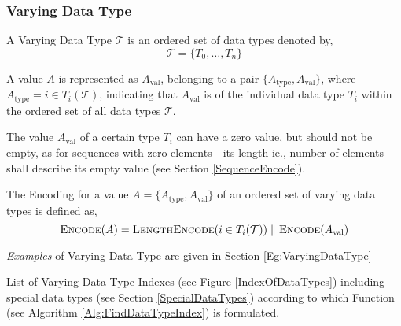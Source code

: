 \documentclass[../alan-handbook.tex]{subfiles}
\begin{document}
\subsubsection{Varying Data Type} 
\label{VaryingDataType}

A Varying Data Type $\mathcal{T}$ is an ordered set of data types denoted by,
$$\mathcal{T} = \{T_0, \ldots, T_n\}$$

A value $A$ is represented as $A_{\text{val}}$, belonging to a pair $\{A_{\text{type}}, A_{\text{val}}\}$, where $A_{\text{type}} = i \in T_i(\mathcal{T})$, indicating that $A_{\text{val}}$ is of the individual data type $T_i$ within the ordered set of all data types $\mathcal{T}$. 

The value $A_{\text{val}}$ of a certain type $T_i$ can have a zero value, but should not be empty, as for sequences with zero elements - its length ie., number of elements shall describe its empty value (see Section \ref{SequenceEncode}).

The Encoding for a value $A=\{A_{\text{type}}, A_{\text{val}}\}$ of an ordered set of varying data types is defined as,
$$\Call{Encode}{A} = \Call{LengthEncode}{i \in T_i(\mathcal{T})} \parallel \Call{Encode}{A_{\text{val}}}$$

\textit{Examples} of Varying Data Type are given in Section \ref{Eg:VaryingDataType}

\label{IndexOfDataTypesSection}

List of Varying Data Type Indexes (see Figure \ref{IndexOfDataTypes}) including special data types (see Section \ref{SpecialDataTypes}) according to which  Function (see Algorithm \ref{Alg:FindDataTypeIndex}) is formulated.
    
\end{document}
